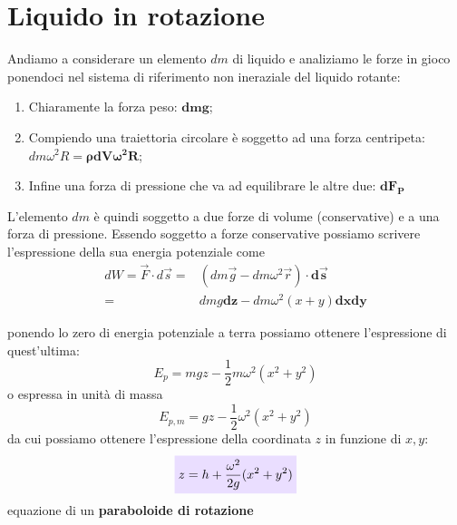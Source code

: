 \documentclass[x11names]{report}
\newcommand{\viola}[1]{\colorbox{yred}{$\displaystyle #1$}}
\begin{document}
	
	\section{Liquido in rotazione}
	Andiamo a considerare un elemento \(dm\) di liquido e analiziamo le forze in gioco ponendoci nel sistema di riferimento non ineraziale del liquido rotante: 
	\begin{enumerate}
		\item Chiaramente la forza peso: \(\boldsymbol{dmg}\);
		\item Compiendo una traiettoria circolare è soggetto ad una forza centripeta: \(dm\omega^2R = \boldsymbol{\rho dV\omega^2 R}\);
		\item Infine una forza di pressione che va ad equilibrare le altre due: \(\boldsymbol{dF_{P}}\)
	\end{enumerate}
	L'elemento \(dm\) è quindi soggetto a due forze di volume (conservative) e a una forza di pressione. Essendo soggetto a forze conservative possiamo scrivere l'espressione della sua energia potenziale come
	\begin{align*}
		dW = \overrightarrow{F} \cdot d\vec{s} =& (dm \vec{g} - dm \omega^2 \vec{r}) \cdot \boldsymbol{d\vec{s}}\\
		=& dmg\boldsymbol{dz} - dm \omega^2(x+y)\boldsymbol{dxdy}
	\end{align*} 
	\begin{minipage}{0.5\textwidth}
		ponendo lo zero di energia potenziale a terra possiamo ottenere l'espressione di quest'ultima:
		\[ 
		E_{p} = mgz - \frac{1}{2}m\omega ^2(x^2 + y^2)
		\]
		o espressa in unità di massa
		\[ 
		E_{p,m} = gz - \frac{1}{2}\omega ^2(x^2 + y^2)
		\]
		da cui possiamo ottenere l'espressione della coordinata \(z\) in funzione di \(x,y\):
		\begin{equation}
			\viola{z = h +\frac{\omega ^2}{2g}(x^2 +y^2)}
		\end{equation}
		equazione di un \textbf{paraboloide di rotazione}
	\end{minipage}
\end{document}
